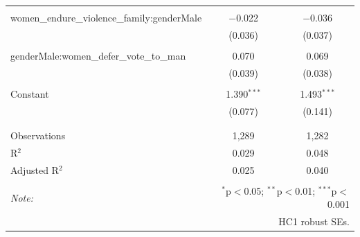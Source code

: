 \begin{table}[!htbp]
\begin{tabular}{@{\extracolsep{5pt}}lcc}
  & & \\ 
 women\_endure\_violence\_family:genderMale & $-$0.022 & $-$0.036 \\ 
  & (0.036) & (0.037) \\ 
  & & \\ 
 genderMale:women\_defer\_vote\_to\_man & 0.070 & 0.069 \\ 
  & (0.039) & (0.038) \\ 
  & & \\ 
 Constant & 1.390$^{***}$ & 1.493$^{***}$ \\ 
  & (0.077) & (0.141) \\ 
  & & \\ 
\hline \\[-1.8ex] 
Observations & 1,289 & 1,282 \\ 
R$^{2}$ & 0.029 & 0.048 \\ 
Adjusted R$^{2}$ & 0.025 & 0.040 \\ 
\hline 
\hline \\[-1.8ex] 
\textit{Note:}  & \multicolumn{2}{r}{$^{*}$p$<$0.05; $^{**}$p$<$0.01; $^{***}$p$<$0.001} \\ 
 & \multicolumn{2}{r}{HC1 robust SEs.} \\ 
\end{tabular} 
\end{table} 
